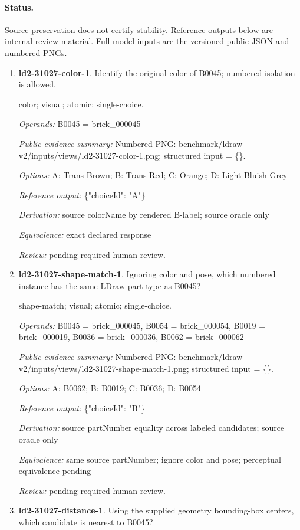 \paragraph{Status.}Source preservation does not certify stability. Reference outputs below are internal review material. Full model inputs are the versioned public JSON and numbered PNGs.
\begin{enumerate}
\item \textbf{ld2-31027-color-1}. Identify the original color of B0045; numbered isolation is allowed.
\par{\small color; visual; atomic; single-choice.\par\textit{Operands:} B0045 = brick\_000045\par\textit{Public evidence summary:} Numbered PNG: benchmark/ldraw-v2/inputs/views/ld2-31027-color-1.png; structured input = \{\}.\par\textit{Options:} A: Trans Brown; B: Trans Red; C: Orange; D: Light Bluish Grey\par\textit{Reference output:} \{"choiceId": "A"\}\par\textit{Derivation:} source colorName by rendered B-label; source oracle only\par\textit{Equivalence:} exact declared response\par\textit{Review:} pending required human review.}
\item \textbf{ld2-31027-shape-match-1}. Ignoring color and pose, which numbered instance has the same LDraw part type as B0045?
\par{\small shape-match; visual; atomic; single-choice.\par\textit{Operands:} B0045 = brick\_000045, B0054 = brick\_000054, B0019 = brick\_000019, B0036 = brick\_000036, B0062 = brick\_000062\par\textit{Public evidence summary:} Numbered PNG: benchmark/ldraw-v2/inputs/views/ld2-31027-shape-match-1.png; structured input = \{\}.\par\textit{Options:} A: B0062; B: B0019; C: B0036; D: B0054\par\textit{Reference output:} \{"choiceId": "B"\}\par\textit{Derivation:} source partNumber equality across labeled candidates; source oracle only\par\textit{Equivalence:} same source partNumber; ignore color and pose; perceptual equivalence pending\par\textit{Review:} pending required human review.}
\item \textbf{ld2-31027-distance-1}. Using the supplied geometry bounding-box centers, which candidate is nearest to B0045?

\end{enumerate}
